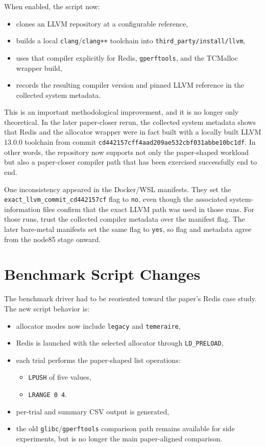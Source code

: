 \documentclass[a4paper,11pt]{article}
\begin{document}
When enabled, the script now:

\begin{itemize}[leftmargin=1.5em]
  \item clones an LLVM repository at a configurable reference,
  \item builds a local \texttt{clang}/\texttt{clang++} toolchain into
  \texttt{third\_party/install/llvm},
  \item uses that compiler explicitly for Redis, \texttt{gperftools}, and the
  TCMalloc wrapper build,
  \item records the resulting compiler version and pinned LLVM reference in the
  collected system metadata.
\end{itemize}

This is an important methodological improvement, and it is no longer only
theoretical. In the later paper-closer rerun, the collected system metadata
shows that Redis and the allocator wrapper were in fact built with a locally
built LLVM 13.0.0 toolchain from commit
\texttt{cd442157cff4aad209ae532cbf031abbe10bc1df}. In other words, the
repository now supports not only the paper-shaped workload but also a
paper-closer compiler path that has been exercised successfully end to end.

One inconsistency appeared in the Docker/WSL manifests. They set the
\texttt{exact\_llvm\_}\allowbreak\texttt{commit\_cd442157cf} flag to
\texttt{no}, even though the associated system-information files confirm that the
exact LLVM path was used in those runs. For those runs, trust the collected
compiler metadata over the manifest flag. The later bare-metal manifests set the
same flag to \texttt{yes}, so flag and metadata agree from the node85 stage
onward.

\section{Benchmark Script Changes}

The benchmark driver had to be reoriented toward the paper's Redis case study.
The new script behavior is:

\begin{itemize}[leftmargin=1.5em]
  \item allocator modes now include \texttt{legacy} and \texttt{temeraire},
  \item Redis is launched with the selected allocator through \texttt{LD\_PRELOAD},
  \item each trial performs the paper-shaped list operations:
  \begin{itemize}[leftmargin=1.5em]
    \item \texttt{LPUSH} of five values,
    \item \texttt{LRANGE 0 4}.
  \end{itemize}
  \item per-trial and summary CSV output is generated,
  \item the old \texttt{glibc}/\texttt{gperftools} comparison path remains available for side experiments, but is no longer the main paper-aligned comparison.
\end{itemize}
\end{document}
